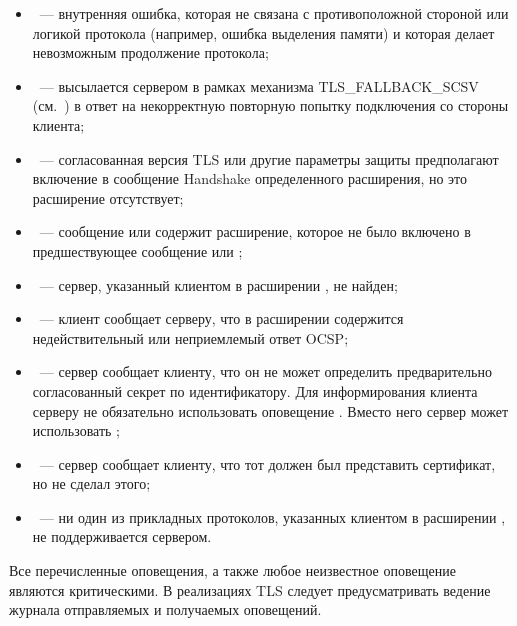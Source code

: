 \begin{itemize}
\item\label{ALERT.Err.ie}
~--- внутренняя ошибка, которая не связана с 
противоположной стороной или логикой протокола (например, ошибка  
выделения памяти) и которая делает невозможным продолжение протокола;

\item\label{ALERT.Err.if}
~--- высылается сервером в рамках механизма 
{TLS\_FALLBACK\_SCSV} (см.~\cite{RFC7507}) в ответ на некорректную повторную 
попытку подключения со стороны клиента;

\item\label{ALERT.Err.me}
~--- согласованная версия TLS или другие параметры 
защиты предполагают включение в сообщение Handshake определенного расширения,
но это расширение отсутствует;

\item\label{ALERT.Err.ue}
~--- сообщение  или 
 содержит расширение, которое не было включено  
в предшествующее сообщение  или 
;


\item\label{ALERT.Err.un}
~--- сервер, указанный клиентом в расширении 
, не найден;

\item\label{ALERT.Err.bcsr}
~--- клиент сообщает серверу, что 
в расширении  содержится недействительный или 
неприемлемый ответ OCSP;

\item\label{ALERT.Err.upi}
~--- сервер сообщает клиенту, что он не может 
определить предварительно согласованный секрет по идентификатору.
%
Для информирования клиента серверу не обязательно использовать оповещение 
. Вместо него сервер может использовать 
;

\item\label{ALERT.Err.cr2}
~--- сервер сообщает клиенту, что тот должен был 
представить сертификат, но не сделал этого; 

\item\label{ALERT.Err.nap}
~--- ни один из прикладных протоколов, указанных 
клиентом в расширении 
, не поддерживается 
сервером.
\end{itemize}

Все перечисленные оповещения, а также любое неизвестное оповещение являются критическими. 
%
В реализациях TLS следует предусматривать ведение журнала отправляемых и 
получаемых оповещений.
